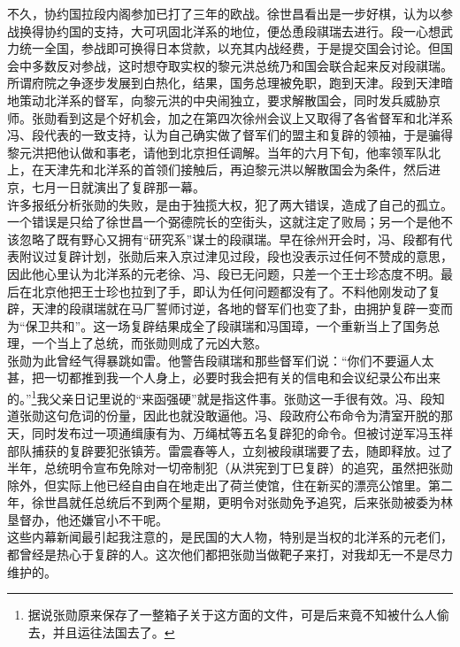 不久，协约国拉段内阁参加已打了三年的欧战。徐世昌看出是一步好棋，认为以参战换得协约国的支持，大可巩固北洋系的地位，便怂恿段祺瑞去进行。段一心想武力统一全国，参战即可换得日本贷款，以充其内战经费，于是提交国会讨论。但国会中多数反对参战，这时想夺取实权的黎元洪总统乃和国会联合起来反对段祺瑞。所谓府院之争逐步发展到白热化，结果，国务总理被免职，跑到天津。段到天津暗地策动北洋系的督军，向黎元洪的中央闹独立，要求解散国会，同时发兵威胁京师。张勋看到这是个好机会，加之在第四次徐州会议上又取得了各省督军和北洋系冯、段代表的一致支持，认为自己确实做了督军们的盟主和复辟的领袖，于是骗得黎元洪把他认做和事老，请他到北京担任调解。当年的六月下旬，他率领军队北上，在天津先和北洋系的首领们接触后，再迫黎元洪以解散国会为条件，然后进京，七月一日就演出了复辟那一幕。\\

许多报纸分析张勋的失败，是由于独揽大权，犯了两大错误，造成了自己的孤立。一个错误是只给了徐世昌一个弼德院长的空街头，这就注定了败局；另一个是他不该忽略了既有野心又拥有“研究系”谋士的段祺瑞。早在徐州开会时，冯、段都有代表附议过复辟计划，张勋后来入京过津见过段，段也没表示过任何不赞成的意思，因此他心里认为北洋系的元老徐、冯、段已无问题，只差一个王士珍态度不明。最后在北京他把王士珍也拉到了手，即认为任何问题都没有了。不料他刚发动了复辟，天津的段祺瑞就在马厂誓师讨逆，各地的督军们也变了卦，由拥护复辟一变而为“保卫共和”。这一场复辟结果成全了段祺瑞和冯国璋，一个重新当上了国务总理，一个当上了总统，而张勋则成了元凶大憝。\\

张勋为此曾经气得暴跳如雷。他警告段祺瑞和那些督军们说：“你们不要逼人太甚，把一切都推到我一个人身上，必要时我会把有关的信电和会议纪录公布出来的。”\footnote{据说张勋原来保存了一整箱子关于这方面的文件，可是后来竟不知被什么人偷去，并且运往法国去了。}我父亲日记里说的“来函强硬”就是指这件事。张勋这一手很有效。冯、段知道张勋这句危词的份量，因此也就没敢逼他。冯、段政府公布命令为清室开脱的那天，同时发布过一项通缉康有为、万绳栻等五名复辟犯的命令。但被讨逆军冯玉祥部队捕获的复辟要犯张镇芳。雷震春等人，立刻被段祺瑞要了去，随即释放。过了半年，总统明令宣布免除对一切帝制犯（从洪宪到丁巳复辟）的追究，虽然把张勋除外，但实际上他已经自由自在地走出了荷兰使馆，住在新买的漂亮公馆里。第二年，徐世昌就任总统后不到两个星期，更明令对张勋免予追究，后来张勋被委为林垦督办，他还嫌官小不干呢。\\

这些内幕新闻最引起我注意的，是民国的大人物，特别是当权的北洋系的元老们，都曾经是热心于复辟的人。这次他们都把张勋当做靶子来打，对我却无一不是尽力维护的。\\

